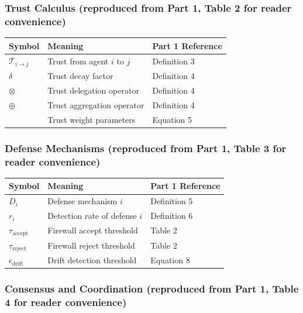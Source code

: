 \documentclass[
]{article}
\newcounter{none} %
\begin{document}
\subsubsection{Trust Calculus (reproduced from Part 1, Table 2 for
reader
convenience)}\label{trust-calculus-reproduced-from-part-1-table-2-for-reader-convenience}

{\def\LTcaptype{none} %
\begin{longtable}[]{@{}lll@{}}
\toprule\noalign{}
Symbol & Meaning & Part 1 Reference \\
\midrule\noalign{}
\endhead
\bottomrule\noalign{}
\endlastfoot
\(\mathcal{T}_{i \to j}\) & Trust from agent \(i\) to \(j\) & Definition
3 \\
\(\delta\) & Trust decay factor & Definition 4 \\
\(\otimes\) & Trust delegation operator & Definition 4 \\
\(\oplus\) & Trust aggregation operator & Definition 4 \\
\(\alpha, \beta, \gamma) & Trust weight parameters & Equation 5 \\
\end{longtable}
}

\subsubsection{Defense Mechanisms (reproduced from Part 1, Table 3 for
reader
convenience)}\label{defense-mechanisms-reproduced-from-part-1-table-3-for-reader-convenience}

{\def\LTcaptype{none} %
\begin{longtable}[]{@{}lll@{}}
\toprule\noalign{}
Symbol & Meaning & Part 1 Reference \\
\midrule\noalign{}
\endhead
\bottomrule\noalign{}
\endlastfoot
\(D_i\) & Defense mechanism \(i\) & Definition 5 \\
\(r_i\) & Detection rate of defense \(i\) & Definition 6 \\
\(\tau_{\text{accept}}\) & Firewall accept threshold & Table 2 \\
\(\tau_{\text{reject}}\) & Firewall reject threshold & Table 2 \\
\(\epsilon_{\text{drift}}\) & Drift detection threshold & Equation 8 \\
\end{longtable}
}

\subsubsection{Consensus and Coordination (reproduced from Part 1, Table
4 for reader
convenience)}\label{consensus-and-coordination-reproduced-from-part-1-table-4-for-reader-convenience}
\end{document}
